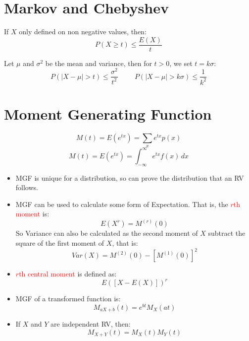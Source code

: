 \documentclass[12pt]{article}
\begin{document}
\begin{multicols*}{4}
    \section{Markov and Chebyshev}
    \begin{tcolorbox}[title=Markov's Inequality]
        If $X$ only defined on non negative values, then:
        $$P(X\geq t)\leq\frac{E(X)}{t}$$
    \end{tcolorbox}
    \begin{tcolorbox}[title=Chebyshev's Inequality]
        Let $\mu$ and $\sigma^2$ be the mean and variance, then for $t>0$, we set $t=k\sigma$:
        $$P(|X-\mu|>t)\leq\frac{\sigma^2}{t^2}\hspace{1cm}P(|X-\mu|>k\sigma)\leq\frac{1}{k^2}$$
    \end{tcolorbox}
    \section{Moment Generating Function}
    $$M(t)=E(e^{tx})=\sum_{x}e^{tx}p(x)$$
    $$M(t)=E(e^{tx})=\int_{-\infty}^\infty e^{tx}f(x)\,dx$$
    \begin{tcolorbox}[title=Properties of Moment Generating Function]
        \begin{itemize}[leftmargin=*]
            \item MGF is unique for a distribution, so can prove the distribution that an RV follows.
            \item MGF can be used to calculate some form of Expectation. That is, the \textcolor{red}{$r$th moment }is:
                  $$E(X^r)=M^{(r)}(0)$$
                  So Variance can also be calculated as the second moment of $X$ subtract the square of the first moment of $X$, that is:
                  $$Var(X)=M^{(2)}(0)-[M^{(1)}(0)]^2$$
            \item \textcolor{red}{$r$th central moment} is defined as:
                  $$E([X-E(X)])^r$$
            \item MGF of a transformed function is:
                  $$M_{aX+b}(t)=e^{bt}M_X(at)$$
            \item If $X$ and $Y$ are independent RV, then:
                  $$M_{X+Y}(t)=M_X(t)M_Y(t)$$
        \end{itemize}
    \end{tcolorbox}

\end{multicols*}
\end{document}
